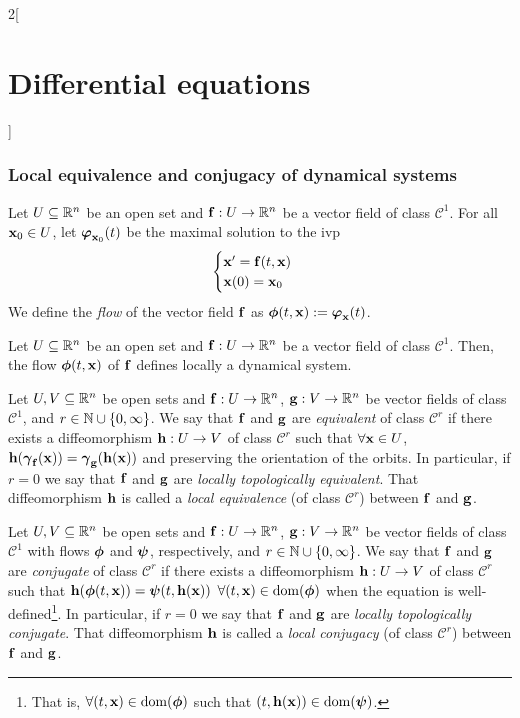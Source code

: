 \documentclass[../../../main.tex]{subfiles}
\begin{document}
\begin{multicols}{2}[\section{Differential equations}]
  \subsubsection{Local equivalence and conjugacy of dynamical systems}
  \begin{definition}
    Let $U\subseteq \mathbb{R}^n$ be an open set and $\boldsymbol{\mathrm{f}}:U\rightarrow\mathbb{R}^n$ be a vector field of class $\mathcal{C}^1$. For all $\boldsymbol{\mathrm{x}}_0\in U$, let $\boldsymbol{\mathrm{\varphi}}_{\boldsymbol{\mathrm{x}}_0}(t)$ be the maximal solution to the ivp
    $$
      \begin{cases}
        \boldsymbol{\mathrm{x}}'      =\boldsymbol{\mathrm{f}}(t,\boldsymbol{\mathrm{x}}) \\
        \boldsymbol{\mathrm{x}}(0)  =\boldsymbol{\mathrm{x}}_0
      \end{cases}
    $$
    We define the \emph{flow} of the vector field $\boldsymbol{\mathrm{f}}$ as $\boldsymbol{\mathrm{\phi}}(t,\boldsymbol{\mathrm{x}}):=\boldsymbol{\mathrm{\varphi}}_{\boldsymbol{\mathrm{x}}}(t)$.
  \end{definition}
  \begin{proposition}
    Let $U\subseteq \mathbb{R}^n$ be an open set and $\boldsymbol{\mathrm{f}}:U\rightarrow\mathbb{R}^n$ be a vector field of class $\mathcal{C}^1$. Then, the flow $\boldsymbol{\mathrm{\phi}}(t,\boldsymbol{\mathrm{x}})$ of $\boldsymbol{\mathrm{f}}$ defines locally a dynamical system.
  \end{proposition}
  \begin{definition}
    Let $U,V\subseteq \mathbb{R}^n$ be open sets and $\boldsymbol{\mathrm{f}}:U\rightarrow\mathbb{R}^n$, $\boldsymbol{\mathrm{g}}:V\rightarrow\mathbb{R}^n$ be vector fields of class $\mathcal{C}^1$, and $r\in\mathbb{N}\cup\{0,\infty\}$. We say that $\boldsymbol{\mathrm{f}}$ and $\boldsymbol{\mathrm{g}}$ are \emph{equivalent} of class $\mathcal{C}^r$ if there exists a diffeomorphism $\boldsymbol{\mathrm{h}}:U\rightarrow V$ of class $\mathcal{C}^r$ such that $\forall \boldsymbol{\mathrm{x}}\in U$, $\boldsymbol{\mathrm{h}}(\boldsymbol{\mathrm{\gamma}}_{\boldsymbol{\mathrm{f}}}(\boldsymbol{\mathrm{x}}))=\boldsymbol{\mathrm{\gamma}}_{\boldsymbol{\mathrm{g}}}(\boldsymbol{\mathrm{h}}(\boldsymbol{\mathrm{x}}))$ and preserving the orientation of the orbits. In particular, if $r=0$ we say that $\boldsymbol{\mathrm{f}}$ and $\boldsymbol{\mathrm{g}}$ are \emph{locally topologically equivalent}. That diffeomorphism $\boldsymbol{\mathrm{h}}$ is called a \emph{local equivalence} (of class $\mathcal{C}^r$) between $\boldsymbol{\mathrm{f}}$ and $\boldsymbol{\mathrm{g}}$.
  \end{definition}
  \begin{definition}
    Let $U,V\subseteq \mathbb{R}^n$ be open sets and $\boldsymbol{\mathrm{f}}:U\rightarrow\mathbb{R}^n$, $\boldsymbol{\mathrm{g}}:V\rightarrow\mathbb{R}^n$ be vector fields of class $\mathcal{C}^1$ with flows $\boldsymbol{\mathrm{\phi}}$ and $\boldsymbol{\mathrm{\psi}}$, respectively, and $r\in\mathbb{N}\cup\{0,\infty\}$. We say that $\boldsymbol{\mathrm{f}}$ and $\boldsymbol{\mathrm{g}}$ are \emph{conjugate} of class $\mathcal{C}^r$ if there exists a diffeomorphism $\boldsymbol{\mathrm{h}}:U\rightarrow V$ of class $\mathcal{C}^r$ such that $\boldsymbol{\mathrm{h}}(\boldsymbol{\mathrm{\phi}}(t,\boldsymbol{\mathrm{x}}))=\boldsymbol{\mathrm{\psi}}(t,\boldsymbol{\mathrm{h}}(\boldsymbol{\mathrm{x}}))$ $\forall(t,\boldsymbol{\mathrm{x}})\in \operatorname{dom}(\boldsymbol{\mathrm{\phi}})$ when the equation is well-defined\footnote{That is, $\forall(t,\boldsymbol{\mathrm{x}})\in \operatorname{dom}(\boldsymbol{\mathrm{\phi}})$ such that $(t,\boldsymbol{\mathrm{h}}(\boldsymbol{\mathrm{x}}))\in \operatorname{dom}(\boldsymbol{\mathrm{\psi}})$.}. In particular, if $r=0$ we say that $\boldsymbol{\mathrm{f}}$ and $\boldsymbol{\mathrm{g}}$ are \emph{locally topologically conjugate}. That diffeomorphism $\boldsymbol{\mathrm{h}}$ is called a \emph{local conjugacy} (of class $\mathcal{C}^r$) between $\boldsymbol{\mathrm{f}}$ and $\boldsymbol{\mathrm{g}}$.

\end{definition}
\end{multicols}
\end{document}
